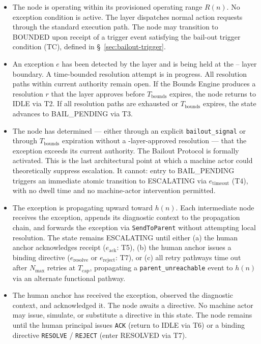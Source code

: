 \begin{itemize}\itemsep=0pt
\item[\textbf{IDLE.}] The node is operating within its provisioned operating range $R(n)$. No exception condition is active. The \fact{} layer dispatches normal action requests through the standard execution path. The node may transition to BOUNDED upon receipt of a trigger event satisfying the bail-out trigger condition (TC), defined in \S~\ref{sec:bailout-trigger}.

\item[\textbf{BOUNDED.}] An exception $e$ has been detected by the \bounds{} layer and is being held at the \bounds{}--\fact{} layer boundary. A time-bounded resolution attempt is in progress. All resolution paths within current authority remain open. If the Bounds Engine produces a resolution $r$ that the \fact{} layer approves before $T_{\text{bounds}}$ expires, the node returns to IDLE via T2. If all resolution paths are exhausted or $T_{\text{bounds}}$ expires, the state advances to BAIL\_PENDING via T3.

\item[\textbf{BAIL\_PENDING.}] The node has determined --- either through an explicit \texttt{bailout\_signal} or through $T_{\text{bounds}}$ expiration without a \fact-layer-approved resolution --- that the exception exceeds its current authority. The Bailout Protocol is formally activated. This is the last architectural point at which a machine actor could theoretically suppress escalation. It cannot: entry to BAIL\_PENDING triggers an immediate atomic transition to ESCALATING via $e_{\text{timeout}}$ (T4), with no dwell time and no machine-actor intervention permitted.

\item[\textbf{ESCALATING.}] The exception is propagating upward toward $h(n)$. Each intermediate node receives the exception, appends its diagnostic context to the propagation chain, and forwards the exception via \texttt{SendToParent} without attempting local resolution. The state remains ESCALATING until either (a) the human anchor acknowledges receipt ($e_{\text{ack}}$: T5), (b) the human anchor issues a binding directive ($e_{\text{resolve}}$ or $e_{\text{reject}}$: T7), or (c) all retry pathways time out after $N_{\max}$ retries at $T_{\text{cap}}$, propagating a \texttt{parent\_unreachable} event to $h(n)$ via an alternate functional pathway.

\item[\textbf{HUMAN\_ACKNOWLEDGED.}] The human anchor has received the exception, observed the diagnostic context, and acknowledged it. The node awaits a directive. No machine actor may issue, simulate, or substitute a directive in this state. The node remains until the human principal issues \texttt{ACK} (return to IDLE via T6) or a binding directive \texttt{RESOLVE} / \texttt{REJECT} (enter RESOLVED via T7).


\end{itemize}
